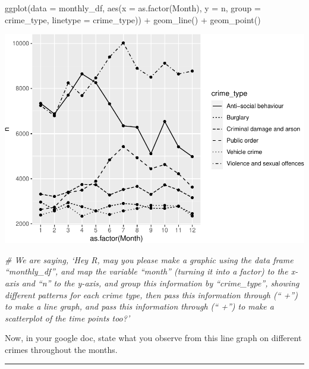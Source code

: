 \documentclass[
]{book}
\newenvironment{Shaded}{\begin{snugshade}}{\end{snugshade}}
\newcommand{\AttributeTok}[1]{\textcolor[rgb]{0.77,0.63,0.00}{#1}}
\newcommand{\CommentTok}[1]{\textcolor[rgb]{0.56,0.35,0.01}{\textit{#1}}}
\newcommand{\FunctionTok}[1]{\textcolor[rgb]{0.00,0.00,0.00}{#1}}
\newcommand{\NormalTok}[1]{#1}
\newcommand{\SpecialCharTok}[1]{\textcolor[rgb]{0.00,0.00,0.00}{#1}}
\begin{document}
\begin{Shaded}
\begin{Highlighting}[]
\FunctionTok{ggplot}\NormalTok{(}\AttributeTok{data =}\NormalTok{ monthly\_df, }\FunctionTok{aes}\NormalTok{(}\AttributeTok{x =} \FunctionTok{as.factor}\NormalTok{(Month), }\AttributeTok{y =}\NormalTok{ n, }\AttributeTok{group =}\NormalTok{ crime\_type, }\AttributeTok{linetype =}\NormalTok{ crime\_type)) }\SpecialCharTok{+} 
  \FunctionTok{geom\_line}\NormalTok{() }\SpecialCharTok{+} 
  \FunctionTok{geom\_point}\NormalTok{()}
\end{Highlighting}
\end{Shaded}

\includegraphics{03-data-visualisation_files/figure-latex/unnamed-chunk-20-1.pdf}

\begin{Shaded}
\begin{Highlighting}[]
\CommentTok{\# We are saying, ‘Hey R, may you please make a graphic using the data frame “monthly\_df”, and map the variable “month” (turning it into a factor) to the x{-}axis and “n” to the y{-}axis, and group this information by “crime\_type”, showing different patterns for each crime type, then pass this information through (“ +”) to make a line graph, and pass this information through (“ +”) to make a scatterplot of the time points too?’}
\end{Highlighting}
\end{Shaded}

Now, in your google doc, state what you observe from this line graph on different crimes throughout the months.

\begin{center}\rule{0.5\linewidth}{0.5pt}\end{center}
\end{document}
